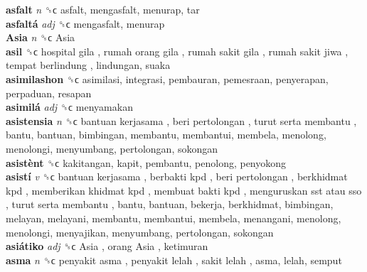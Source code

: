 \textbf{asfalt} \emph{n}  ␝ϲ  asfalt, mengasfalt, menurap, tar  \\
\textbf{asfaltá} \emph{adj}  ␝ϲ  mengasfalt, menurap  \\
\textbf{Asia} \emph{n}  ␝ϲ   Asia   \\
\textbf{asil} ␝ϲ   hospital gila ,  rumah orang gila ,  rumah sakit gila ,  rumah sakit jiwa ,  tempat berlindung , lindungan, suaka  \\
\textbf{asimilashon} ␝ϲ  asimilasi, integrasi, pembauran, pemesraan, penyerapan, perpaduan, resapan  \\
\textbf{asimilá} \emph{adj}  ␝ϲ  menyamakan  \\
\textbf{asistensia} \emph{n}  ␝ϲ   bantuan kerjasama ,  beri pertolongan ,  turut serta membantu , bantu, bantuan, bimbingan, membantu, membantui, membela, menolong, menolongi, menyumbang, pertolongan, sokongan  \\
\textbf{asistènt} ␝ϲ  kakitangan, kapit, pembantu, penolong, penyokong  \\
\textbf{asistí} \emph{v}  ␝ϲ   bantuan kerjasama ,  berbakti kpd ,  beri pertolongan ,  berkhidmat kpd ,  memberikan khidmat kpd ,  membuat bakti kpd ,  menguruskan sst atau sso ,  turut serta membantu , bantu, bantuan, bekerja, berkhidmat, bimbingan, melayan, melayani, membantu, membantui, membela, menangani, menolong, menolongi, menyajikan, menyumbang, pertolongan, sokongan  \\
\textbf{asiátiko} \emph{adj}  ␝ϲ   Asia ,  orang Asia , ketimuran  \\
\textbf{asma} \emph{n}  ␝ϲ   penyakit asma ,  penyakit lelah ,  sakit lelah , asma, lelah, semput  \\
